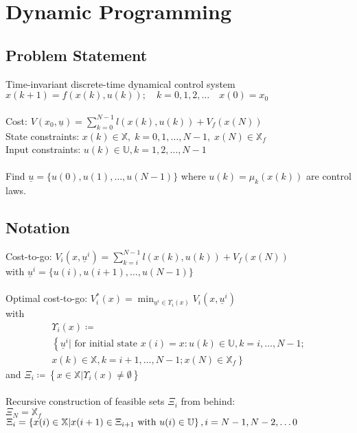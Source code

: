 \documentclass[english]{latex4ei/latex4ei_sheet}
\begin{document}
\section{Dynamic Programming}
\begin{sectionbox}

\subsection{Problem Statement}
Time-invariant discrete-time dynamical control system\\
$x(k+1)=f(x(k), u(k)) ; \quad k=0,1,2, \ldots \quad x(0)=x_{0}$ \\ \\
Cost: $V\left(x_{0}, \underline{u}\right)=\sum\limits_{k=0}^{N-1} l(x(k), u(k))+V_{f}(x(N))$ \\
State constraints: $x(k) \in \mathbb{X},\; k=0,1, \ldots, N-1,\; x(N) \in \mathbb{X}_{f}$\\
Input constraints: $u(k) \in \mathbb{U}, k=1,2, \ldots, N-1$ \\ \\
Find $\underline{u}=\{u(0), u(1), \ldots, u(N-1)\}$ where $u(k)=\mu_{k}(x(k))$ are control laws.\\

\subsection{Notation}
Cost-to-go: $V_{i}\left(x, \underline{u}^{i}\right)=\sum\limits_{k=i}^{N-1} l(x(k), u(k))+V_{f}(x(N))$ \\
with $\underline{u}^{i}=\{u(i), u(i+1), \ldots, u(N-1)\}$ \\ \\
Optimal cost-to-go: $V_{i}^{*}(x)=\min _{\underline{u}^{i} \in \Upsilon_{i}(x)} V_{i}\left(x, \underline{u}^{i}\right)$ \\
with
\begin{multline*} \Upsilon_{i}(x)\coloneqq\\\left\{\underline{u}^{i} | \text { for initial state } x(i)=x: u(k) \in \mathbb{U}, k=i, \ldots, N-1;\right.\\\left.x(k) \in \mathbb{X}, k=i+1, \ldots, N-1 ; x(N) \in \mathbb{X}_{f}\right\} 
\end{multline*}
and $\Xi_{i}\coloneqq\left\{x \in \mathbb{X} | \Upsilon_{i}(x) \neq \emptyset\right\}$ \\
\\
Recursive construction of feasible sets $\Xi_{i}$ from behind:\\ 
$\Xi_{N}=\mathbb{X}_{f}$ \\ 
$\Xi_{i}=\left\{x(i) \in \mathbb{X} | x(i+1) \in \Xi_{i+1} \text { with } u(i) \in \mathbb{U}\right\},\\
i=N-1, N-2, \ldots 0$\\


\end{sectionbox}
\end{document}
